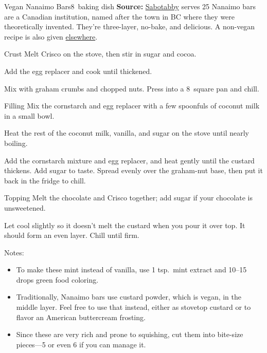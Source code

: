\begin{recipe}{Vegan Nanaimo Bars}{8\inch{}\inch\ baking dish \hfill }{\textbf{Source:} \href{https://sabotabby.dreamwidth.org/2062019.html}{Sabotabby} \hfill serves 25}
  \freeform Nanaimo bars are a Canadian institution, named after the town in BC where they were theoretically invented. They're three-layer, no-bake, and delicious. A non-vegan recipe is also given \hyperref[Nanaimo Bars]{elsewhere}.

\freeform Crust
Melt Crisco on the stove, then stir in sugar and cocoa.

Add the egg replacer and cook until thickened.

Mix with graham crumbs and chopped nuts. Press into a 8\inch\ square pan and chill.

\freeform Filling
Mix the cornstarch and egg replacer with a few spoonfuls of coconut milk in a small bowl.

Heat the rest of the coconut milk, vanilla, and sugar on the stove until nearly boiling.

\newstep Add the cornstarch mixture and egg replacer, and heat gently until the custard thickens. Add sugar to taste.
\newstep Spread evenly over the graham-nut base, then put it back in the fridge to chill.

\freeform Topping
Melt the chocolate and Crisco together; add sugar if your chocolate is unsweetened.

\newstep Let cool slightly so it doesn't melt the custard when you pour it over top. It should form an even layer. Chill until firm.

\freeform Notes:
\begin{itemize}
  \item To make these mint instead of vanilla, use 1 tsp.\ mint extract and 10--15 drops green food coloring.
  \item Traditionally, Nanaimo bars use custard powder, which is vegan, in the middle layer. Feel free to use that instead, either as stovetop custard or to flavor an American buttercream frosting.
  \item Since these are very rich and prone to squishing, cut them into bite-size pieces---5 or even 6 if you can manage it.
\end{itemize}
\end{recipe}